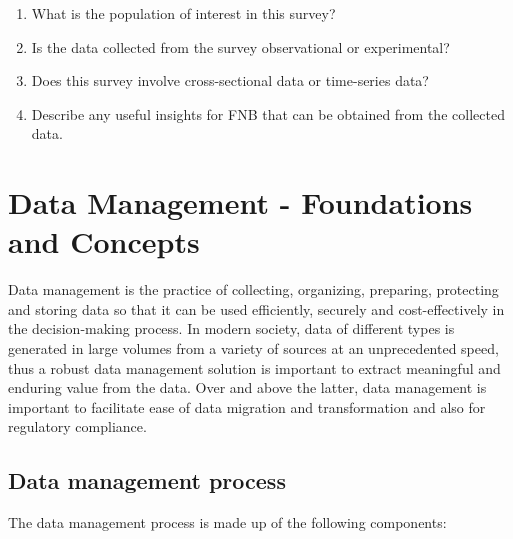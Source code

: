 \documentclass[
]{book}
\begin{document}
\begin{enumerate}
\def\labelenumi{\alph{enumi}.}
\item
  What is the population of interest in this survey?
\item
  Is the data collected from the survey observational or experimental?
\item
  Does this survey involve cross-sectional data or time-series data?
\item
  Describe any useful insights for FNB that can be obtained from the collected data.
\end{enumerate}

\newpage

\section{Data Management - Foundations and Concepts}\label{sec1-3}

Data management is the practice of collecting, organizing, preparing, protecting and storing data so that it can be used efficiently, securely and cost-effectively in the decision-making process. In modern society, data of different types is generated in large volumes from a variety of sources at an unprecedented speed, thus a robust data management solution is important to extract meaningful and enduring value from the data. Over and above the latter, data management is important to facilitate ease of data migration and transformation and also for regulatory compliance.

\subsection{Data management process}\label{data-management-process}

The data management process is made up of the following components:
\end{document}
